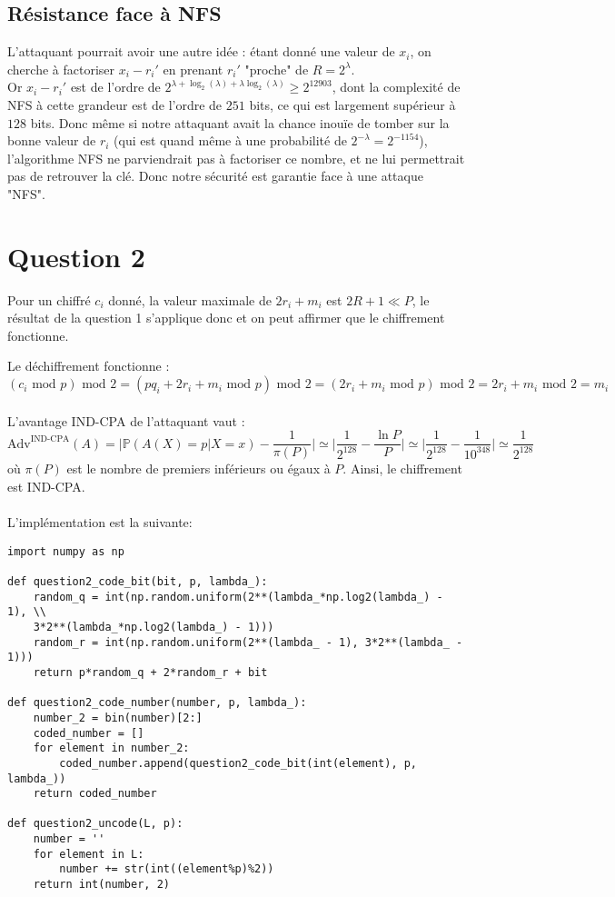 \documentclass{article}
\begin{document}
\subsection{Résistance face à NFS}

L'attaquant pourrait avoir une autre idée : étant donné une valeur de $x_i$, on cherche à factoriser $x_i - r_i'$ en prenant $r_i'$ "proche" de $R = 2^\lambda$.\\
Or $x_i-r_i'$ est de l'ordre de $2^{\lambda + \log_2(\lambda) + \lambda \log_2(\lambda)} \geq 2^{12903}$, dont la complexité de NFS à cette grandeur est de l'ordre de $251$ bits, ce qui est largement supérieur à $128$ bits. Donc même si notre attaquant avait la chance inouïe de tomber sur la bonne valeur de $r_i$ (qui est quand même à une probabilité de $2^{-\lambda} = 2^{-1154}$), l'algorithme NFS ne parviendrait pas à factoriser ce nombre, et ne lui permettrait pas de retrouver la clé. Donc notre sécurité est garantie face à une attaque "NFS".

\section{Question 2}
\par Pour un chiffré $c_i$ donné, la valeur maximale de $2r_i+m_i$ est $2R+1 \ll P$, le résultat de la question 1 s'applique donc et on peut affirmer que le chiffrement fonctionne.\\
\par Le déchiffrement fonctionne : $$(c_i \textrm{ mod } p)\textrm{ mod } 2 = (pq_i + 2r_i+m_i \textrm{ mod } p)\textrm{ mod } 2 = ( 2r_i+m_i \textrm{ mod } p)\textrm{ mod } 2=2r_i+m_i\textrm{ mod } 2 = m_i$$ 
\\
L'avantage IND-CPA de l'attaquant vaut : $$\textrm{Adv}^{\textrm{IND-CPA}}(A) = \bigg|\mathbb{P}(A(X)=p|X=x) - \frac{1}{\pi(P)} \bigg| \simeq \bigg|\frac{1}{2^{128}} - \frac{\ln P}{P} \bigg| \simeq \bigg|\frac{1}{2^{128}} - \frac{1}{10^{348}} \bigg| \simeq \frac{1}{2^{128}}$$
où $\pi(P)$ est le nombre de premiers inférieurs ou égaux à $P$. Ainsi, le chiffrement est IND-CPA. \\ \\
L'implémentation est la suivante: 
\begin{lstlisting}
import numpy as np

def question2_code_bit(bit, p, lambda_):
    random_q = int(np.random.uniform(2**(lambda_*np.log2(lambda_) - 1), \\
    3*2**(lambda_*np.log2(lambda_) - 1)))
    random_r = int(np.random.uniform(2**(lambda_ - 1), 3*2**(lambda_ - 1)))
    return p*random_q + 2*random_r + bit

def question2_code_number(number, p, lambda_):
    number_2 = bin(number)[2:]
    coded_number = []
    for element in number_2:
        coded_number.append(question2_code_bit(int(element), p, lambda_))
    return coded_number

def question2_uncode(L, p):
    number = ''
    for element in L:
        number += str(int((element%p)%2))
    return int(number, 2)
\end{lstlisting}
\end{document}
